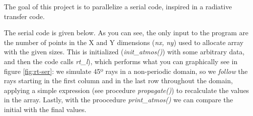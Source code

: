 The goal of this project is to parallelize a serial code, inspired in a
radiative transfer code.

The serial code is given below. As you can see, the only input to the program
are the number of points in the X and Y dimensions (\textit{nx, ny}) used to
allocate array with the given sizes. This is initialized (\textit{init\_atmos()})
with some arbitrary data, and then the code calls \textit{rt\_l}), which performs
what you can graphically see in figure \ref{fig:rt-ser}: we simulate 45º rays in
a non-periodic domain, so we \textit{follow} the rays starting in the first
column and in the last row throughout the domain, applying a simple expression
(see procedure \textit{propagate()}) to recalculate the values in the
array. Lastly, with the proocedure \textit{print\_atmos()} we can compare the
initial with the final values.

